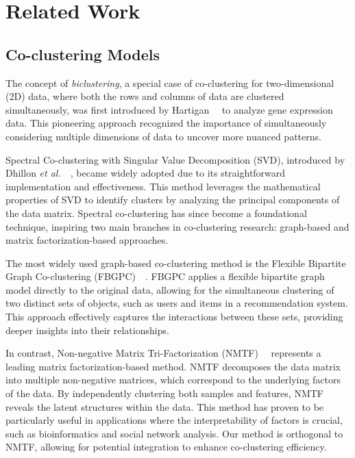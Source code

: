 \documentclass[journal]{IEEEtran}
\renewcommand{\cite}[1]{~\autocite{#1}}
\begin{document}
\section{Related Work}
\label{sec:related_work}
\subsection{Co-clustering Models}

The concept of \emph{biclustering}, a special case of co-clustering for two-dimensional (2D) data, where both the rows and columns of data are clustered simultaneously, was first introduced by Hartigan~\cite{hartigan1972DirectClusteringData} to analyze gene expression data. This pioneering approach recognized the importance of simultaneously considering multiple dimensions of data to uncover more nuanced patterns.

Spectral Co-clustering with Singular Value Decomposition (SVD), introduced by Dhillon \textit{et al.}~\cite{dhillon2001CoclusteringDocumentsWords}, became widely adopted due to its straightforward implementation and effectiveness. This method leverages the mathematical properties of SVD to identify clusters by analyzing the principal components of the data matrix. Spectral co-clustering has since become a foundational technique, inspiring two main branches in co-clustering research: graph-based and matrix factorization-based approaches.

The most widely used graph-based co-clustering method is the Flexible Bipartite Graph Co-clustering (FBGPC)~\cite{chen2023FastFlexibleBipartitea}. FBGPC applies a flexible bipartite graph model directly to the original data, allowing for the simultaneous clustering of two distinct sets of objects, such as users and items in a recommendation system. This approach effectively captures the interactions between these sets, providing deeper insights into their relationships.

In contrast, Non-negative Matrix Tri-Factorization (NMTF)~\cite{long2005CoclusteringBlockValue} represents a leading matrix factorization-based method. NMTF decomposes the data matrix into multiple non-negative matrices, which correspond to the underlying factors of the data. By independently clustering both samples and features, NMTF reveals the latent structures within the data. This method has proven to be particularly useful in applications where the interpretability of factors is crucial, such as bioinformatics and social network analysis. Our method is orthogonal to NMTF, allowing for potential integration to enhance co-clustering efficiency.
\end{document}

